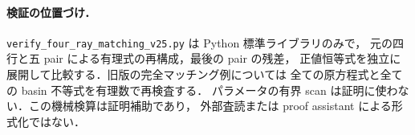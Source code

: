 \paragraph{検証の位置づけ．}
\texttt{verify\_four\_ray\_matching\_v25.py} は Python 標準ライブラリのみで，
元の四行と五 pair による有理式の再構成，最後の pair の残差，
正値恒等式を独立に展開して比較する．旧版の完全マッチング例については
全ての原方程式と全ての basin 不等式を有理数で再検査する．
パラメータの有界 scan は証明に使わない．この機械検算は証明補助であり，
外部査読または proof assistant による形式化ではない．
